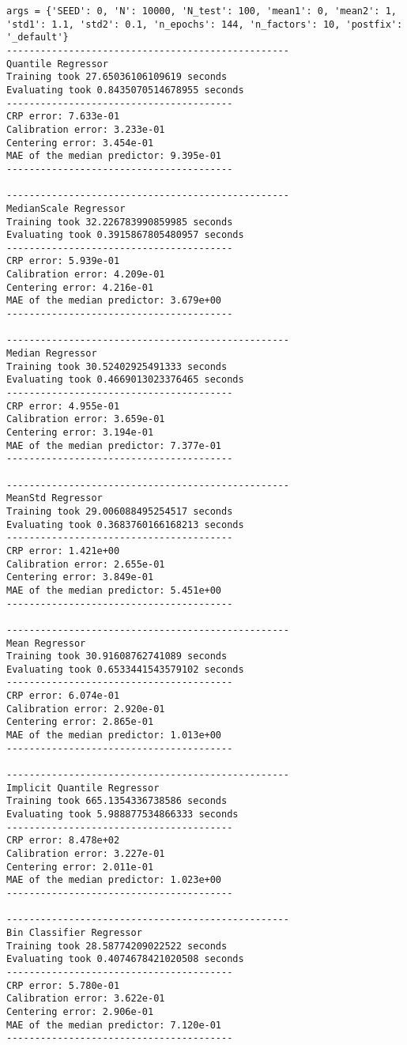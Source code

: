 \documentclass{article}
\begin{document}
\begin{verbatim}
args = {'SEED': 0, 'N': 10000, 'N_test': 100, 'mean1': 0, 'mean2': 1,
'std1': 1.1, 'std2': 0.1, 'n_epochs': 144, 'n_factors': 10, 'postfix': '_default'}
--------------------------------------------------
Quantile Regressor
Training took 27.65036106109619 seconds
Evaluating took 0.8435070514678955 seconds
----------------------------------------
CRP error: 7.633e-01
Calibration error: 3.233e-01
Centering error: 3.454e-01
MAE of the median predictor: 9.395e-01
----------------------------------------

--------------------------------------------------
MedianScale Regressor
Training took 32.226783990859985 seconds
Evaluating took 0.3915867805480957 seconds
----------------------------------------
CRP error: 5.939e-01
Calibration error: 4.209e-01
Centering error: 4.216e-01
MAE of the median predictor: 3.679e+00
----------------------------------------

--------------------------------------------------
Median Regressor
Training took 30.52402925491333 seconds
Evaluating took 0.4669013023376465 seconds
----------------------------------------
CRP error: 4.955e-01
Calibration error: 3.659e-01
Centering error: 3.194e-01
MAE of the median predictor: 7.377e-01
----------------------------------------

--------------------------------------------------
MeanStd Regressor
Training took 29.006088495254517 seconds
Evaluating took 0.3683760166168213 seconds
----------------------------------------
CRP error: 1.421e+00
Calibration error: 2.655e-01
Centering error: 3.849e-01
MAE of the median predictor: 5.451e+00
----------------------------------------

--------------------------------------------------
Mean Regressor
Training took 30.91608762741089 seconds
Evaluating took 0.6533441543579102 seconds
----------------------------------------
CRP error: 6.074e-01
Calibration error: 2.920e-01
Centering error: 2.865e-01
MAE of the median predictor: 1.013e+00
----------------------------------------

--------------------------------------------------
Implicit Quantile Regressor
Training took 665.1354336738586 seconds
Evaluating took 5.988877534866333 seconds
----------------------------------------
CRP error: 8.478e+02
Calibration error: 3.227e-01
Centering error: 2.011e-01
MAE of the median predictor: 1.023e+00
----------------------------------------

--------------------------------------------------
Bin Classifier Regressor
Training took 28.58774209022522 seconds
Evaluating took 0.4074678421020508 seconds
----------------------------------------
CRP error: 5.780e-01
Calibration error: 3.622e-01
Centering error: 2.906e-01
MAE of the median predictor: 7.120e-01
----------------------------------------
\end{verbatim}
\end{document}
